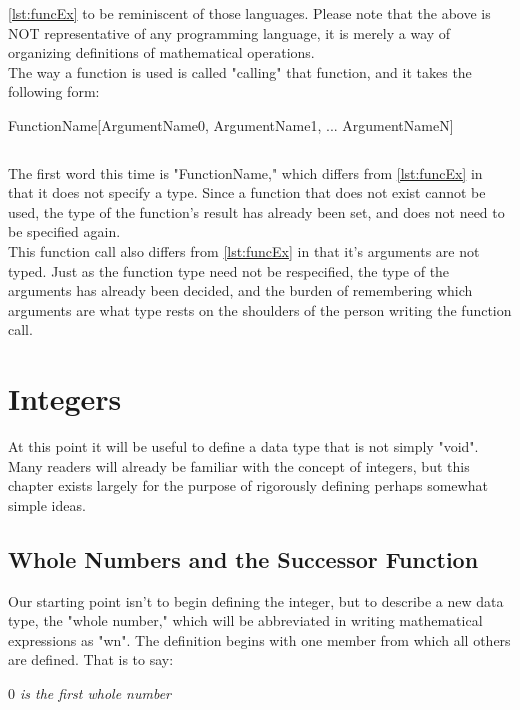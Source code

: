 \ref{lst:funcEx} to be reminiscent of those languages. Please note that the above is NOT representative of any programming language, it is merely a way of organizing definitions of mathematical operations. \\
The way a function is used is called "calling" that function, and it takes the following form:
\begin{center}
FunctionName[ArgumentName0, ArgumentName1, ... ArgumentNameN]
\begin{verbatim}
\end{verbatim}
\end{center}
The first word this time is "FunctionName," which differs from \ref{lst:funcEx} in that it does not specify a type. Since a function that does not exist cannot be used, the type of the function's result has already been set, and does not need to be specified again. \\
This function call also differs from \ref{lst:funcEx} in that it's arguments are not typed. Just as the function type need not be respecified, the type of the arguments has already been decided, and the burden of remembering which arguments are what type rests on the shoulders of the person writing the function call.

\section{Integers}
At this point it will be useful to define a data type that is not simply "void". Many readers will already be familiar with the concept of integers, but this chapter exists largely for the purpose of rigorously defining perhaps somewhat simple ideas. \\


\subsection{Whole Numbers and the Successor Function}
Our starting point isn't to begin defining the integer, but to describe a new data type, the "whole number," which will be abbreviated in writing mathematical expressions as "wn". The definition begins with one member from which all others are defined. That is to say:
\begin{center}
\textit{$0$ is the first whole number}
\end{center}

